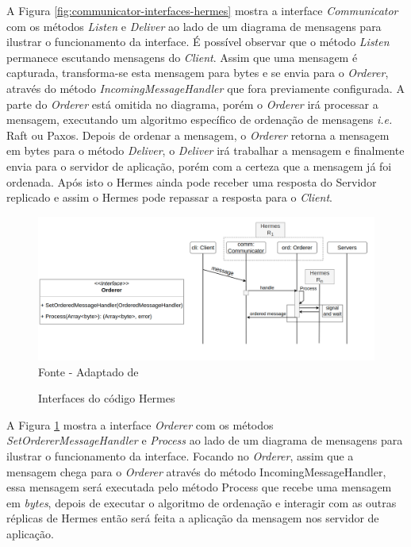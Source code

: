 A Figura \ref{fig:communicator-interfaces-hermes} mostra a interface \textit{Communicator} com os métodos \textit{Listen} e \textit{Deliver} ao lado de um diagrama de mensagens para ilustrar o funcionamento da interface. É possível observar que o método \textit{Listen} permanece escutando mensagens do \textit{Client}. Assim que uma mensagem é capturada, transforma-se esta mensagem para bytes e se envia para o \textit{Orderer}, através do método \textit{IncomingMessageHandler} que fora previamente configurada. A parte do \textit{Orderer} está omitida no diagrama, porém o \textit{Orderer} irá processar a mensagem, executando um algoritmo específico de ordenação de mensagens \textit{i.e.} Raft ou Paxos. Depois de ordenar a mensagem, o \textit{Orderer} retorna a mensagem em bytes para o método \textit{Deliver}, o \textit{Deliver} irá trabalhar a mensagem e finalmente envia para o servidor de aplicação, porém com a certeza que a mensagem já foi ordenada. Após isto o Hermes ainda pode receber uma resposta do Servidor replicado e assim o Hermes pode repassar a resposta para o \textit{Client}.

\begin{figure}[!htb]
\centering
\caption{Interfaces do código Hermes}
\includegraphics[width=\linewidth]{figures/orderer.drawio.png}
{\flushleft Fonte - Adaptado de \textcite{renan2021hermes}}
\label{fig:orderer-interfaces-hermes}
\end{figure}

A Figura \ref{fig:orderer-interfaces-hermes} mostra a interface \textit{Orderer} com os métodos \textit{SetOrdererMessageHandler} e \textit{Process} ao lado de um diagrama de mensagens para ilustrar o funcionamento da interface. Focando no \textit{Orderer}, assim que a mensagem chega para o \textit{Orderer} através do método IncomingMessageHandler, essa mensagem será executada pelo método Process que recebe uma mensagem em \textit{bytes}, depois de executar o algoritmo de ordenação e interagir com as outras réplicas de Hermes então será feita a aplicação da mensagem nos servidor de aplicação.
